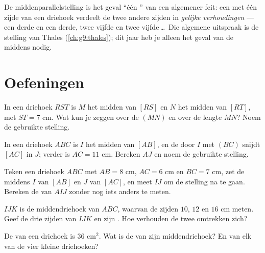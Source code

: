 \begin{remark}
De middenparallelstelling is het geval ``één '' van een algemener feit: een
  met één zijde van een driehoek verdeelt de twee andere zijden in
\emph{gelijke verhoudingen} --- een derde en een derde, twee vijfde en twee
vijfde\,\dots\ Die algemene uitspraak is de stelling van Thales
(\cref{ch:g9:thales}); dit jaar heb je alleen het geval van de middens nodig.
\end{remark}

\section{Oefeningen}

\begin{exercise}[$\star$]\label{exo:g8:midpoints:1}
In een driehoek $RST$ is $M$ het midden van $[RS]$ en $N$ het midden van $[RT]$,
met $ST = 7$ cm. Wat kun je zeggen over de  $(MN)$ en over de lengte $MN$?
Noem de gebruikte stelling.
\end{exercise}

\begin{exercise}[$\star$]\label{exo:g8:midpoints:2}
In een driehoek $ABC$ is $I$ het midden van $[AB]$, en de  door $I$ 
met $(BC)$ snijdt $[AC]$ in $J$; verder is $AC = 11$ cm. Bereken $AJ$ en noem de
gebruikte stelling.
\end{exercise}

\begin{exercise}[$\star$]\label{exo:g8:midpoints:3}
Teken een driehoek $ABC$ met $AB = 8$ cm, $AC = 6$ cm en $BC = 7$ cm, zet de
middens $I$ van $[AB]$ en $J$ van $[AC]$, en meet $IJ$ om de stelling na te gaan.
Bereken de  van $AIJ$ zonder nog iets anders te meten.
\end{exercise}

\begin{exercise}[$\star$]\label{exo:g8:midpoints:4}
$IJK$ is de middendriehoek van $ABC$, waarvan de zijden $10$, $12$ en $16$ cm
meten. Geef de drie zijden van $IJK$ en zijn . Hoe verhouden de twee
omtrekken zich?
\end{exercise}

\begin{exercise}[$\star$]\label{exo:g8:midpoints:5}
De  van een driehoek is $36$ cm$^2$. Wat is de  van zijn
middendriehoek? En van elk van de vier kleine driehoeken?
\end{exercise}

